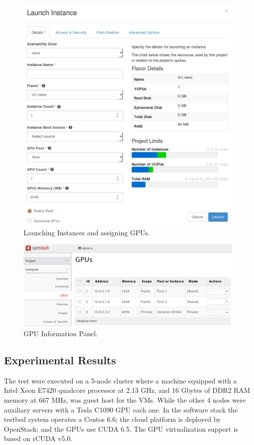 \documentclass[a4paper,twoside]{article}
\begin{document}
\begin{figure}[htb]
  \centering
  \includegraphics[width=\linewidth]{images/UI-launch.pdf}
  \caption{Launching Instances and assigning GPUs.}
  \label{fig:ui-launch}
\end{figure}
  
\begin{figure}[htb]
  \centering
  \includegraphics[width=\linewidth]{images/UI-rgpus.pdf}
  \caption{GPU Information Panel.}
  \label{fig:ui-rgpus}
\end{figure}

\subsection{Experimental Results}
The test were executed on a 5-node cluster where a machine
equipped with a Intel Xeon E7420 quadcore processor at
2.13 GHz, and 16 Gbytes of DDR2 RAM memory at 667
MHz, was guest host for the VMs. While the other 4 nodes
were auxiliary servers with a Tesla C1090 GPU each one. 
In the software stack the testbed system operates a
Centos 6.6; the cloud platform is deployed by OpenStack; and
the GPUs use CUDA 6.5. The GPU virtualization support is
based on rCUDA v5.0.
\end{document}
